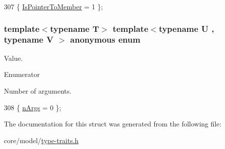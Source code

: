 \begin{DoxyCode}
307 \{ \hyperlink{structTypeTraits_1_1PtrToMemberTraits_3_01U_07V_1_1_5_08_07void_08_4_a484ebbde0a8818f1553ee0bc7c5224f3aa4051e64d12bc01c66d7d76cfe9606d4}{IsPointerToMember} = 1    \};
\end{DoxyCode}
\subsubsection[{\texorpdfstring{anonymous enum}{anonymous enum}}]{\setlength{\rightskip}{0pt plus 5cm}template$<$typename T$>$ template$<$typename U , typename V $>$ anonymous enum}\hypertarget{structTypeTraits_1_1PtrToMemberTraits_3_01U_07V_1_1_5_08_07void_08_4_ac296e9a2a1296bf3bcc3798bf1d2885d}{}\label{structTypeTraits_1_1PtrToMemberTraits_3_01U_07V_1_1_5_08_07void_08_4_ac296e9a2a1296bf3bcc3798bf1d2885d}
Value. \begin{Desc}
\item[Enumerator]\par
\begin{description}
\item[{\em 
n\+Args\hypertarget{structTypeTraits_1_1PtrToMemberTraits_3_01U_07V_1_1_5_08_07void_08_4_ac296e9a2a1296bf3bcc3798bf1d2885da83a7cfdf95df854379aa63b538c24ac8}{}\label{structTypeTraits_1_1PtrToMemberTraits_3_01U_07V_1_1_5_08_07void_08_4_ac296e9a2a1296bf3bcc3798bf1d2885da83a7cfdf95df854379aa63b538c24ac8}
}]Number of arguments. \end{description}
\end{Desc}

\begin{DoxyCode}
308 \{ \hyperlink{structTypeTraits_1_1PtrToMemberTraits_3_01U_07V_1_1_5_08_07void_08_4_ac296e9a2a1296bf3bcc3798bf1d2885da83a7cfdf95df854379aa63b538c24ac8}{nArgs} = 0                \};
\end{DoxyCode}


The documentation for this struct was generated from the following file\+:\begin{DoxyCompactItemize}
\item 
core/model/\hyperlink{type-traits_8h}{type-\/traits.\+h}\end{DoxyCompactItemize}
